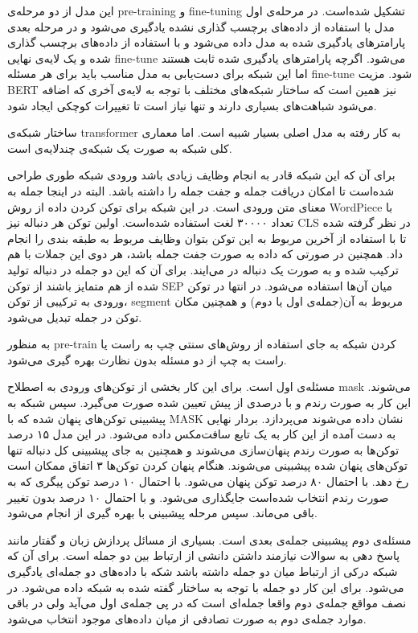 \documentclass[12pt, a4paper, oneside]{report}
\begin{document}
این مدل از دو مرحله‌ی
pre-training
و
fine-tuning
تشکیل شده‌است. در مرحله‌ی اول مدل با استفاده از داده‌های برچسب گذاری نشده یادگیری می‌شود و در مرحله بعدی پارامتر‌های
یادگیری شده به مدل داده می‌شود و با استفاده از داده‌های برچسب گذاری شده و یک لایه‌ی نهایی
fine-tune
می‌شود. اگرچه پارامتر‌های یادگیری شده ثابت هستند اما این شبکه برای دست‌یابی به مدل مناسب باید برای هر مسئله
fine-tune
شود. مزیت
BERT
نیز همین است که ساختار شبکه‌های مختلف با توجه به لایه‌ی آخری که اضافه می‌شود شباهت‌های بسیاری دارند و تنها نیاز است
تا تغییرات کوچکی ایجاد شود.

ساختار شبکه‌ی
transformer
به کار رفته به مدل اصلی بسیار شبیه است. اما معماری کلی شبکه به صورت یک شبکه‌ی چندلایه‌ی
است. 

برای آن که این شبکه قادر به انجام وظایف زیادی باشد ورودی شبکه طوری طراحی شده‌است تا امکان دریافت جمله و جفت جمله
را داشته باشد. البته در اینجا جمله به معنای متن ورودی است.
در این شبکه برای توکن کردن داده از روش
WordPiece
با تعداد ۳۰۰۰۰ لغت استفاده شده‌است. اولین توکن هر دنباله نیز
CLS
در نظر گرفته شده تا با استفاده از آخرین
مربوط به این توکن بتوان وظایف مربوط به طبقه بندی را انجام داد.
همچنین در صورتی که داده به صورت جفت جمله باشد، هر دوی این جملات با هم ترکیب شده و به صورت یک دنباله در می‌ایند.
برای آن که این دو جمله در دنباله تولید شده از هم متمایز باشند از توکن
SEP
میان آن‌ها استفاده می‌شود. در انتها در توکن ورودی به ترکیبی از توکن،
segment
مربوط به آن(جمله‌ی اول یا دوم)
و همچنین مکان توکن در جمله تبدیل می‌شود.

به منظور
pre-train
کردن شبکه‌ به جای استفاده از روش‌های سنتی چپ به راست یا راست به چپ از دو مسئله بدون نظارت بهره گیری می‌شود.

مسئله‌ی اول
است. برای این کار بخشی از توکن‌های ورودی به اصطلاح
mask
می‌شوند. این کار به صورت رندم و با درصدی از پیش تعیین شده صورت می‌گیرد. سپس شبکه به پیشبینی توکن‌های پنهان شده
که با 
MASK
نشان داده می‌شوند می‌پردازد. بردار نهایی به دست آمده از این کار به یک تابع
سافت‌مکس
داده می‌شود. در این مدل ۱۵ درصد توکن‌ها به صورت رندم پنهان‌سازی می‌شوند و همچنین به جای پیشبینی کل دنباله تنها
توکن‌های پنهان شده پیشبینی می‌شوند. هنگام پنهان کردن توکن‌ها ۳ اتفاق ممکان است رخ دهد. با احتمال ۸۰ درصد توکن
پنهان می‌شود. با احتمال ۱۰ درصد توکن پیگری که به صورت رندم انتخاب شده‌است جایگذاری می‌شود. و با احتمال ۱۰ درصد
بدون تغییر باقی می‌ماند. سپس مرحله پیشبینی با بهره گیری از
انجام می‌شود.

مسئله‌ی دوم پیشبینی جمله‌ی بعدی است. بسیاری از مسائل پردازش زبان و گفتار مانند پاسخ دهی به سوالات نیازمند داشتن
دانشی از ارتباط بین دو جمله است. برای آن که شبکه درکی از ارتباط میان دو جمله داشته باشد شکه با داده‌های دو جمله‌ای
یادگیری می‌شود. برای این کار دو جمله با توجه به ساختار گفته شده به شبکه داده می‌شود. در نصف مواقع جمله‌ی دوم
واقعا جمله‌ای است که در پی جمله‌ی اول می‌آید ولی در باقی موارد جمله‌ی دوم به صورت تصادفی از میان داده‌های موجود
انتخاب می‌شود.
\end{document}
